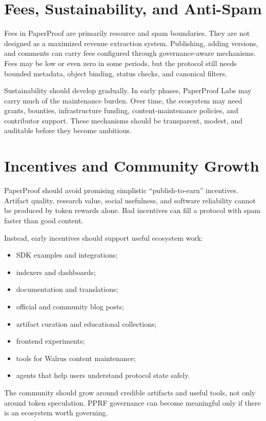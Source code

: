 \documentclass[11pt]{article}
\begin{document}
\section{Fees, Sustainability, and Anti-Spam}

Fees in PaperProof are primarily resource and spam boundaries. They are not
designed as a maximized revenue extraction system. Publishing, adding versions,
and comments can carry fees configured through governance-aware mechanisms.
Fees may be low or even zero in some periods, but the protocol still needs
bounded metadata, object binding, status checks, and canonical filters.

Sustainability should develop gradually. In early phases, PaperProof Labs may
carry much of the maintenance burden. Over time, the ecosystem may need grants,
bounties, infrastructure funding, content-maintenance policies, and contributor
support. These mechanisms should be transparent, modest, and auditable before
they become ambitious.

\section{Incentives and Community Growth}

PaperProof should avoid promising simplistic ``publish-to-earn'' incentives.
Artifact quality, research value, social usefulness, and software reliability
cannot be produced by token rewards alone. Bad incentives can fill a protocol
with spam faster than good content.

Instead, early incentives should support useful ecosystem work:

\begin{itemize}[leftmargin=*]
  \item SDK examples and integrations;
  \item indexers and dashboards;
  \item documentation and translations;
  \item official and community blog posts;
  \item artifact curation and educational collections;
  \item frontend experiments;
  \item tools for Walrus content maintenance;
  \item agents that help users understand protocol state safely.
\end{itemize}

The community should grow around credible artifacts and useful tools, not only
around token speculation. PPRF governance can become meaningful only if there is
an ecosystem worth governing.
\end{document}
